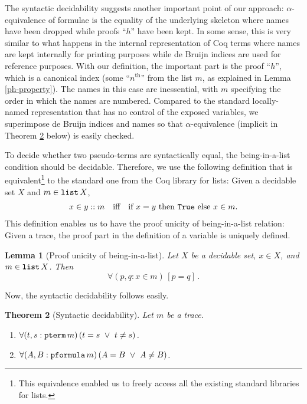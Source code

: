 \documentclass{svjour3}                     %
\newtheorem{thm}{Theorem}%
\newtheorem{lem}[thm]{Lemma}
\newcommand{\al}{\alpha}
\newcommand{\tpterm}{\textup{\tt pterm}}
\newcommand{\tpfml}{\textup{\tt pformula}}
\newcommand{\tlist}{\textup{\tt list}}
\newcommand{\tTrue}{\textup{\tt True}}
\begin{document}
The syntactic decidability suggests another important point of our approach: $\al$-equivalence of formulae is the equality of the underlying skeleton where names have been dropped while proofs ``$h$'' have been kept.
In some sense, this is very similar to what happens in the internal representation of Coq terms where names are kept internally for printing purposes while de Bruijn indices are used for reference purposes. With our definition, the important part is the proof ``$h$'', which is a canonical index (some ``$n^{\text{th}}$'' from the list $m$, as explained in Lemma \ref{ph-property}). The names in this case are inessential, with $m$ specifying the order in which the names are numbered. Compared to the standard locally-named representation that has no control of the exposed variables, we superimpose de Bruijn indices and names so that $\al$-equivalence (implicit in Theorem \ref{syn-dec} below) is easily checked.

To decide whether two pseudo-terms are syntactically equal, the being-in-a-list condition should be decidable. Therefore, we use the following definition that is equivalent\footnote{This equivalence enabled us to freely access all the existing standard libraries for lists.} to  the standard one from the Coq library for lists: Given a decidable set $X$ and $m \in \tlist \, X$,
\begin{eqnarray*}
x \in y :: m \quad \text{iff}\quad  \text{if $x=y$ then $\tTrue$ else $x \in m$.}
\end{eqnarray*}
This definition enables us to have the proof unicity of being-in-a-list relation: Given a trace, the proof part in the definition of a variable is uniquely defined. 

\begin{lem}[Proof unicity of being-in-a-list]\label{proof-uniqueness}
Let $X$ be a decidable set, $x \in X$, and {\em $m \in  \tlist\, X$}. Then
\[
\forall (p, q: x\in m)\, [p = q]\, .
\]
\end{lem}


\noindent Now, the syntactic decidability follows easily.

\begin{thm}[Syntactic decidability]\label{syn-dec} 
  Let $m$ be a trace.
\begin{enumerate}
\item $\forall (t, s: \tpterm\, m)\, (t=s \,\,\lor\,\, t \neq s)$.

\item $\forall (A, B: \tpfml\, m)\, (A = B \,\,\lor\,\, A \neq B)$.
\end{enumerate}
\end{thm}
\end{document}
